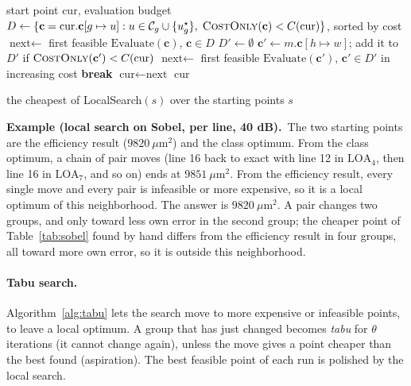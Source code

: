 \documentclass[11pt,a4paper]{article}
\newcommand{\Cost}{C}
\newcommand{\examplebox}[2]{\par\medskip\noindent\colorbox{tabAzul!6}{\begin{minipage}{\dimexpr\linewidth-2\fboxsep}
  \textbf{Example (#1).}\ #2\end{minipage}}\par\medskip}
\begin{document}
\begin{algorithm}[H]
\caption{Local search with pair moves}\label{alg:ls}
\begin{algorithmic}[1]
\Require start point $\text{cur}$, evaluation budget
\Loop
  \State $D \gets \{ \mathbf{c} = \text{cur}.\mathbf{c}[g \mapsto u] : u \in \mathcal{C}_g \cup \{u_g^\star\},\; \textsc{CostOnly}(\mathbf{c}) < \Cost(\text{cur}) \}$, sorted by cost
  \State $\text{next} \gets$ first feasible $\text{Evaluate}(\mathbf{c})$, $\mathbf{c} \in D$
    \State $D' \gets \emptyset$
        \State $\mathbf{c}' \gets m.\mathbf{c}[h \mapsto w]$; add it to $D'$ if $\textsc{CostOnly}(\mathbf{c}') < \Cost(\text{cur})$
      \EndFor
    \EndFor
    \State $\text{next} \gets$ first feasible $\text{Evaluate}(\mathbf{c}')$, $\mathbf{c}' \in D'$ in increasing cost
  \EndIf
   \textbf{break}
  \EndIf
  \State $\text{cur} \gets \text{next}$
\EndLoop
\State \Return $\text{cur}$
\end{algorithmic}
\end{algorithm}

\begin{algorithm}[H]
\caption{Local (the default heuristic of the page)}\label{alg:local}
\begin{algorithmic}[1]
\State \Return the cheapest of LocalSearch$(s)$ over the starting points $s$
\end{algorithmic}
\end{algorithm}

\examplebox{local search on Sobel, per line, 40 dB}{The two starting points are the efficiency result
($9820\ \mu\text{m}^2$) and the class optimum. From the class optimum, a chain of pair moves (line 16 back to exact
with line 12 in $\text{LOA}_4$, then line 16 in $\text{LOA}_7$, and so on) ends at $9851\ \mu\text{m}^2$. From the
efficiency result, every single move and every pair is infeasible or more expensive, so it is a local optimum of this
neighborhood. The answer is $9820\ \mu\text{m}^2$. A pair changes two groups, and only toward less own error in the
second group; the cheaper point of Table~\ref{tab:sobel} found by hand differs from the efficiency result in four
groups, all toward more own error, so it is outside this neighborhood.}

\paragraph{Tabu search.} Algorithm~\ref{alg:tabu} lets the search move to more expensive or infeasible points, to
leave a local optimum. A group that has just changed becomes \emph{tabu} for $\theta$ iterations (it cannot change
again), unless the move gives a point cheaper than the best found (aspiration). The best feasible point of each run
is polished by the local search.
\end{document}
